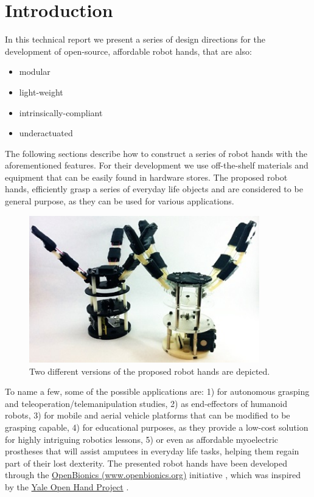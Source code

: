\section{Introduction}

\indent In this technical report we present a series of design directions for the development of open-source, affordable robot hands, that are also:

\begin{itemize}
	\item{modular}
	\item{light-weight}
	\item{intrinsically-compliant}
	\item{underactuated}
\end{itemize}
 
The following sections describe how to construct a series of robot hands with the aforementioned features. For their development we use off-the-shelf materials and equipment that can be easily found in hardware stores. The proposed robot hands, efficiently grasp a series of everyday life objects and are considered to be general purpose, as they can be used for various applications. 

\begin{figure}[H]
 	\begin{center}
\includegraphics[width=10cm]{figures/Intro/RobotHands.jpg}
 	\end{center}
	\caption{Two different versions of the proposed robot hands are depicted.}
	\label{RobotHands}
\end{figure}

To name a few, some of the possible applications are: 1) for autonomous grasping and teleoperation/telemanipulation studies, 2) as end-effectors of humanoid robots, 3) for mobile and aerial vehicle platforms that can be modified to be grasping capable, 4) for educational purposes, as they provide a low-cost solution for highly intriguing robotics lessons, 5) or even as affordable myoelectric prostheses that will assist amputees in everyday life tasks, helping them regain part of their lost dexterity.  The presented robot hands have been developed through the \href{www.openbionics.org}{OpenBionics (www.openbionics.org)} initiative \cite{Liarokapis2014ASURRW}, which was inspired by the \href{http://www.eng.yale.edu/grablab/openhand/}{Yale Open Hand Project} \cite{Ma2013ICRA}.

